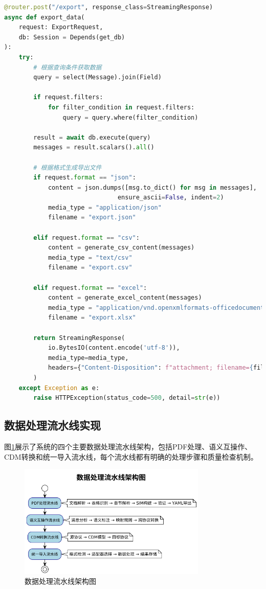 \begin{lstlisting}[language=Python, label=fig:export_api]
@router.post("/export", response_class=StreamingResponse)
async def export_data(
    request: ExportRequest,
    db: Session = Depends(get_db)
):
    try:
        # 根据查询条件获取数据
        query = select(Message).join(Field)
        
        if request.filters:
            for filter_condition in request.filters:
                query = query.where(filter_condition)
        
        result = await db.execute(query)
        messages = result.scalars().all()
        
        # 根据格式生成导出文件
        if request.format == "json":
            content = json.dumps([msg.to_dict() for msg in messages], 
                               ensure_ascii=False, indent=2)
            media_type = "application/json"
            filename = "export.json"
            
        elif request.format == "csv":
            content = generate_csv_content(messages)
            media_type = "text/csv"
            filename = "export.csv"
            
        elif request.format == "excel":
            content = generate_excel_content(messages)
            media_type = "application/vnd.openxmlformats-officedocument.spreadsheetml.sheet"
            filename = "export.xlsx"
        
        return StreamingResponse(
            io.BytesIO(content.encode('utf-8')),
            media_type=media_type,
            headers={"Content-Disposition": f"attachment; filename={filename}"}
        )
    except Exception as e:
        raise HTTPException(status_code=500, detail=str(e))
\end{lstlisting}

\subsection{数据处理流水线实现}

图\ref{fig_data_processing_pipeline}展示了系统的四个主要数据处理流水线架构，包括PDF处理、语义互操作、CDM转换和统一导入流水线，每个流水线都有明确的处理步骤和质量检查机制。

\begin{figure}[H]
    \centering
    \includegraphics[width=0.8\textwidth,height=0.5\textheight,keepaspectratio]{chapters/fig-0/data_processing_pipeline.png}
    \caption{数据处理流水线架构图}
    \label{fig_data_processing_pipeline}
\end{figure}

